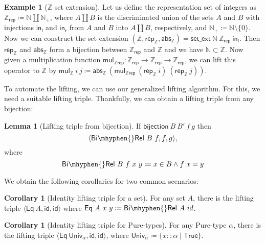 \documentclass{article}
\theoremstyle{definition}
\newtheorem{lemma}[definition]{Lemma}
\newtheorem{corollary}[definition]{Corollary}
\newtheorem{example}[definition]{Example}
\newcommand{\eq}{\mathsf{Eq}}
\newcommand{\id}{\mathsf{id}}
\newcommand{\bijection}{\mathsf{bijection}}
\newcommand{\birel}{\mathsf{Bi\mhyphen{}Rel}}
\newcommand{\univ}{\mathsf{Univ}}
\newcommand{\nat}{\mathbb{N}}
\newcommand{\inte}{\mathbb{Z}}
\newcommand{\abs}{\mathsf{abs}}
\newcommand{\rep}{\mathsf{rep}}
\begin{document}
\begin{example}[$\inte$ set extension]
Let us define the representation set of integers as \(\inte_{\rep} \coloneqq \nat \amalg \nat_+\),
where \(A \amalg B\) is the discriminated union of the sets \(A\) and \(B\)
with injections \(\mathsf{in_l}\) and \(\mathsf{in_r}\) from \(A\) and \(B\) into \(A \amalg B\), respectively,
and \(\nat_+ \coloneqq \nat \setminus \{0\}\).
Now we can construct the set extension \((\inte, \rep_\inte, \abs_\inte) = \mathsf{set\_ext}\ \nat\ \inte_{\rep}\ \mathsf{in_l} \).
Then \(\rep_\inte\) and \(\abs_\inte\) form a bijection between $\inte_{\rep}$ and $\inte$ and we have \(\nat \subset \inte\).
Now given a multiplication function \(\mathsf{mul_{\inte rep}} : \inte_{\rep} \rightarrow \inte_{\rep} \rightarrow \inte_{\rep}\),
we can lift this operator to \(\inte\) by \(\mathsf{mul_\inte}\ i\ j \coloneqq \abs_\inte\ (\mathsf{mul_{\inte rep}}\ (\rep_\inte\ i)\ (\rep_\inte\ j))\).
\end{example}
To automate the lifting,
we can use our generalized lifting algorithm.
For this, we need a suitable lifting triple.
Thankfully, we can obtain a lifting triple from any bijection:
\begin{lemma}[Lifting triple from bijection]\label{lem:lift-trip-bij}
	If \(\bijection\ B\ B'\ f\ g \) then
	\begin{equation}
		\langle \birel\ B\ f, f, g \rangle,
	\end{equation}
	where
	\begin{equation}
		\birel\ B\ f\ x\ y \coloneqq x \in B \land f\ x = y
	\end{equation}
\end{lemma}
We obtain the following corollaries for two common scenarios:
\begin{corollary}[Identity lifting triple for a set]
	For any set \(A\), there is the lifting triple \(\langle \eq\ A, \id, \id \rangle\) where \(\eq\ A\ x\ y \coloneqq \birel\ A\ id\).
\end{corollary}
\begin{corollary}[Identity lifting triple for Pure-types]
  For any Pure-type \(\alpha\), there is the lifting triple \(\langle \eq\ \univ_\alpha, \id, \id \rangle\), where \(\univ_\alpha \coloneqq \{x :: \alpha \mid \mathsf{True}\}\).
\end{corollary}
\end{document}

